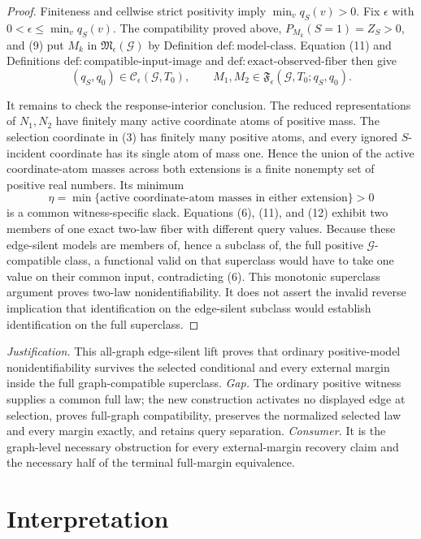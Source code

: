 \documentclass{article}
\begin{document}
\begin{proof}
Finiteness and cellwise strict positivity imply \(\min_vq_S(v)>0\). Fix \(\epsilon\) with \(0<\epsilon\leq\min_vq_S(v)\). The compatibility proved above, \(P_{M_k}(S=1)=Z_S>0\), and (9) put \(M_k\) in \(\mathfrak M_{\epsilon}(\mathcal G)\) by Definition \(\mathrm{def{:}model\text{-}class}\). Equation (11) and Definitions \(\mathrm{def{:}compatible\text{-}input\text{-}image}\) and \(\mathrm{def{:}exact\text{-}observed\text{-}fiber}\) then give
\[
 (q_S,q_0)\in\mathcal C_{\epsilon}(\mathcal G,T_0),
 \qquad
 M_1,M_2\in\mathfrak F_{\epsilon}(\mathcal G,T_0;q_S,q_0).
 \tag{12}
\]

It remains to check the response-interior conclusion. The reduced representations of \(N_1,N_2\) have finitely many active coordinate atoms of positive mass. The selection coordinate in (3) has finitely many positive atoms, and every ignored \(S\)-incident coordinate has its single atom of mass one. Hence the union of the active coordinate-atom masses across both extensions is a finite nonempty set of positive real numbers. Its minimum
\[
 \eta
 =\min\{\text{active coordinate-atom masses in either extension}\}
 >0
 \tag{13}
\]
is a common witness-specific slack. Equations (6), (11), and (12) exhibit two members of one exact two-law fiber with different query values. Because these edge-silent models are members of, hence a subclass of, the full positive \(\mathcal G\)-compatible class, a functional valid on that superclass would have to take one value on their common input, contradicting (6). This monotonic superclass argument proves two-law nonidentifiability. It does not assert the invalid reverse implication that identification on the edge-silent subclass would establish identification on the full superclass.
\end{proof}
\par\smallskip\noindent \textit{Justification.} This all-graph edge-silent lift proves that ordinary positive-model nonidentifiability survives the selected conditional and every external margin inside the full graph-compatible superclass. \textit{Gap.} The ordinary positive witness supplies a common full law; the new construction activates no displayed edge at selection, proves full-graph compatibility, preserves the normalized selected law and every margin exactly, and retains query separation. \textit{Consumer.} It is the graph-level necessary obstruction for every external-margin recovery claim and the necessary half of the terminal full-margin equivalence.

\section{Interpretation}
\end{document}
